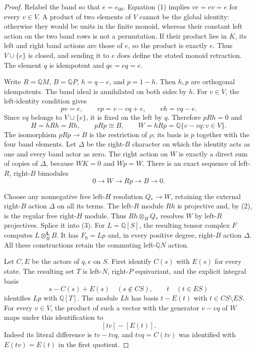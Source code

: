 \begin{proof}
Relabel the band so that $e=e_{00}$.
Equation (1) implies $ve=ev=e$ for every $v\in V$.
A product of two elements of $V$ cannot be the global
identity: otherwise they would be units in the finite
monoid, whereas their constant left action on the two
band rows is not a permutation.
If their product lies in $K$, its left and right band
actions are those of $e$, so the product is exactly $e$.
Thus $V\cup\{e\}$ is closed, and sending it to $e$
does define the stated monoid retraction.
The element $q$ is idempotent and $qe=eq=e$.

Write $R=\mathbb QM$, $B=\mathbb QP$,
$h=q-e$, and $p=1-h$.  Then $h,p$ are orthogonal
idempotents.  The band ideal is annihilated on both
sides by $h$.
For $v\in V$, the left-identity condition gives
\[
 pv=e,\qquad vp=v-vq+e,\qquad vh=vq-e.
\]
Since $vq$ belongs to $V\cup\{e\}$, it is fixed
on the left by $q$.  Therefore $pRh=0$ and
\[
 H=hRh=Rh,\qquad pRp\cong B,
 \qquad W=hRp=\mathbb Q\{v-vq:v\in V\}.                       \tag{2}
\]
The isomorphism $pRp\to B$ is the restriction of
$\rho$; its basis is $p$ together with the four
band elements.
Let $\Delta$ be the right-$B$ character on which
the identity acts as one and every band actor as zero.
The right action on $W$ is exactly a direct sum of
copies of $\Delta$, because $WK=0$ and $Wp=W$.
There is an exact sequence of left-$R$, right-$B$
bimodules
\[
 0\longrightarrow W\longrightarrow Rp
      \longrightarrow B\longrightarrow0.                     \tag{3}
\]

Choose any nonnegative free left-$H$ resolution
$Q_*\to W$, retaining the external right-$B$ action
$\Delta$ on all its terms.
The left-$R$ module $Rh$ is projective and, by (2),
is the regular free right-$H$ module.
Thus $Rh\otimes_H Q_*$ resolves $W$ by left-$R$
projectives.  Splice it into (3).
For $L=\mathbb Q[S]$, the resulting tensor complex
$F$ computes $L\otimes_R^{\mathbf L}B$.
It has $F_0=Lp$ and, in every positive degree,
right-$B$ action $\Delta$.
All these constructions retain the commuting
left-$\mathbb QN$ action.

Let $C,E$ be the actors of $q,e$ on $S$.
First identify $C(s)$ with $E(s)$ for every state.
The resulting set $T$ is left-$N$, right-$P$ equivariant,
and the explicit integral basis
\[
 s-C(s)+E(s)\quad(s\notin CS),\qquad t\quad(t\in ES)
\]
identifies $Lp$ with $\mathbb Q[T]$.
The module $Lh$ has basis $t-E(t)$ with
$t\in CS\setminus ES$.
For every $v\in V$, the product of such a vector
with the generator $v-vq$ of $W$ maps under this
identification to
\[
 [tv]-[E(t)].                                                   \tag{4}
\]
Indeed its literal difference is $tv-tvq$, and
$tvq=C(tv)$ was identified with
$E(tv)=E(t)$ in the first quotient.


\end{proof}
